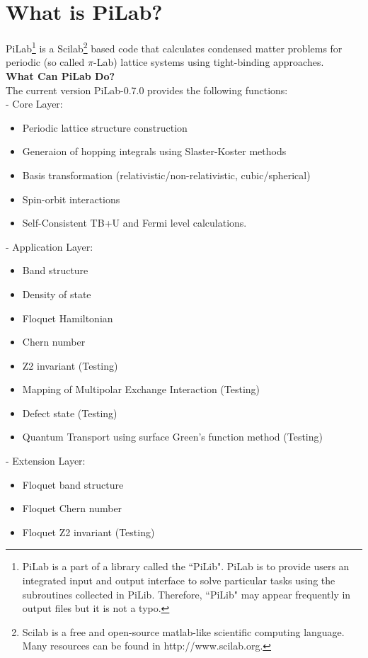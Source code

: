 \documentclass[10pt,a4paper]{article}
\begin{document}
\section{What is PiLab?}
PiLab\footnote{PiLab is a part of a library called the ``PiLib". PiLab is to  provide users an integrated input and output interface to solve particular tasks using the subroutines collected in PiLib. Therefore, ``PiLib" may appear frequently in output files but it is not a typo.} is a Scilab\footnote{Scilab is a free and open-source matlab-like scientific computing language. Many resources can be found in http://www.scilab.org. } based code that calculates condensed matter problems for periodic (so called $\pi$-Lab) lattice systems using tight-binding approaches.\\

\textbf{What Can PiLab Do?} \\

 The current version PiLab-0.7.0 provides the following functions:\\

- Core Layer:
\begin{itemize}
\item Periodic lattice structure construction
\item Generaion of hopping integrals using Slaster-Koster methods
\item Basis transformation (relativistic/non-relativistic, cubic/spherical)  
\item Spin-orbit interactions
\item Self-Consistent TB+U and Fermi level calculations.
\end{itemize}

- Application Layer:
\begin{itemize}
\item Band structure 
\item Density of state
\item Floquet Hamiltonian
\item Chern number
\item Z2 invariant  (Testing)
\item Mapping of Multipolar Exchange Interaction (Testing)
\item Defect state (Testing)
\item Quantum Transport using surface Green's function method (Testing)
\end{itemize} 

- Extension Layer:
\begin{itemize}
\item Floquet band structure
\item Floquet Chern number
\item Floquet Z2 invariant (Testing)
\end{itemize}
\end{document}

